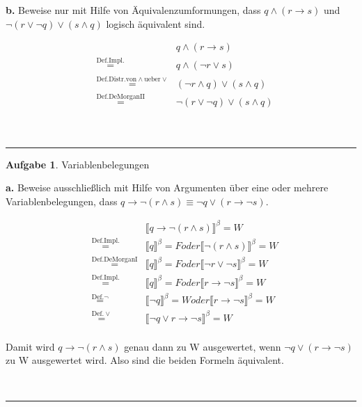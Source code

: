 \documentclass[10pt,leqno ]{article}
\newcommand\customeq[1]{\overset{\mathrm{#1}}{=}}
\theoremstyle{definition}
\newtheorem{problem}[theorem]{Aufgabe}
\newenvironment{solution}[1][L]{\begin{doublespace}\textbf{#1.}\quad }{\ \rule{0.5em}{0.5em}\end{doublespace}}
\begin{document}
\begin{solution}[b]
Beweise nur mit Hilfe von Äquivalenzumformungen, dass \( q \land (r \rightarrow s) \) und \( \lnot(r \lor \lnot q) \lor (s \land q) \) logisch äquivalent sind.    

\begin{equation*}
    \begin{aligned}
    & & q \land (r \rightarrow s) \\
    & \customeq{Def. Impl.} & q \land (\lnot r \lor s)  \\
    & \customeq{Def. Distr. von \land ueber \lor} & (\lnot r \land q) \lor (s \land q) \\
    & \customeq{Def. De Morgan II} & \lnot(r \lor \lnot q) \lor (s \land q) \\
    \end{aligned}
\end{equation*}

\end{solution}


\begin{problem}
    Variablenbelegungen
\end{problem}

\begin{solution}[a]
Beweise ausschließlich mit Hilfe von Argumenten über eine oder mehrere Variablenbelegungen, dass \( q \rightarrow \lnot (r \land s) \equiv \lnot q \lor (r \rightarrow \lnot s) \).

\begin{equation*}
    \begin{aligned}
    & & \llbracket q \rightarrow \lnot (r \land s) \rrbracket ^ \beta = W \\
    & \customeq{Def. Impl.} & \llbracket q \rrbracket ^ \beta = F oder \llbracket \lnot (r \land s) \rrbracket ^ \beta = W  \\
    & \customeq{Def. De Morgan I} & \llbracket q \rrbracket ^ \beta = F oder \llbracket \lnot r \lor \lnot s \rrbracket ^ \beta = W  \\
    & \customeq{Def. Impl.} & \llbracket q \rrbracket ^ \beta = F oder \llbracket r \rightarrow \lnot s \rrbracket ^ \beta = W  \\
    & \customeq{Def. \lnot} & \llbracket \lnot q \rrbracket ^ \beta = W oder \llbracket r \rightarrow \lnot s \rrbracket ^ \beta = W  \\
    & \customeq{Def. \lor} & \llbracket \lnot q \lor r \rightarrow \lnot s \rrbracket ^ \beta = W  \\
    \end{aligned}
\end{equation*}

Damit wird \( q \rightarrow \lnot (r \land s) \) genau dann zu W ausgewertet, wenn \( \lnot q \lor (r \rightarrow \lnot s) \) zu W ausgewertet wird.
Also sind die beiden Formeln äquivalent.

\end{solution}
    
\end{document}
